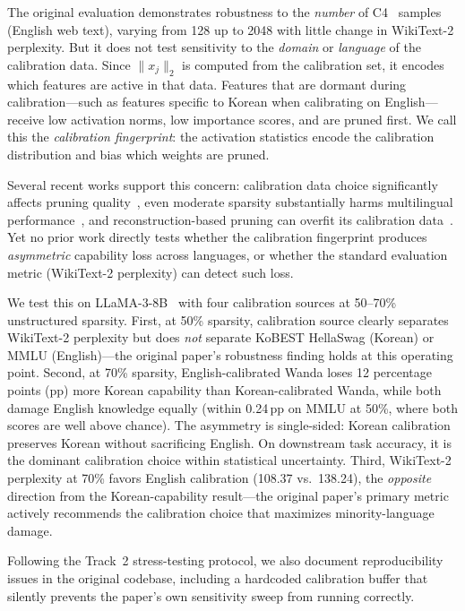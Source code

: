 \documentclass{article}
\begin{document}
The original evaluation demonstrates robustness to the \emph{number} of C4~\citep{raffel2020t5} samples (English web text), varying from 128 up to 2048 with little change in WikiText-2 perplexity.
But it does not test sensitivity to the \emph{domain} or \emph{language} of the calibration data.
Since $\|x_j\|_2$ is computed from the calibration set, it encodes which features are active in that data.
Features that are dormant during calibration---such as features specific to Korean when calibrating on English---receive low activation norms, low importance scores, and are pruned first.
We call this the \emph{calibration fingerprint}: the activation statistics encode the calibration distribution and bias which weights are pruned.

Several recent works support this concern: calibration data choice significantly affects pruning quality~\citep{ji2025calibration}, even moderate sparsity substantially harms multilingual performance~\citep{choenni2025multilingual}, and reconstruction-based pruning can overfit its calibration data~\citep{shin2024calibration}.
Yet no prior work directly tests whether the calibration fingerprint produces \emph{asymmetric} capability loss across languages, or whether the standard evaluation metric (WikiText-2 perplexity) can detect such loss.

We test this on LLaMA-3-8B~\citep{grattafiori2024llama3} with four calibration sources at 50--70\% unstructured sparsity.
First, at 50\% sparsity, calibration source clearly separates WikiText-2 perplexity but does \emph{not} separate KoBEST HellaSwag (Korean) or MMLU (English)---the original paper's robustness finding holds at this operating point.
Second, at 70\% sparsity, English-calibrated Wanda loses 12 percentage points (pp) more Korean capability than Korean-calibrated Wanda, while both damage English knowledge equally (within 0.24\,pp on MMLU at 50\%, where both scores are well above chance).
The asymmetry is single-sided: Korean calibration preserves Korean without sacrificing English.
On downstream task accuracy, it is the dominant calibration choice within statistical uncertainty.
Third, WikiText-2 perplexity at 70\% favors English calibration (108.37 vs.\ 138.24), the \emph{opposite} direction from the Korean-capability result---the original paper's primary metric actively recommends the calibration choice that maximizes minority-language damage.

Following the Track~2 stress-testing protocol, we also document reproducibility issues in the original codebase, including a hardcoded calibration buffer that silently prevents the paper's own sensitivity sweep from running correctly.
\end{document}
